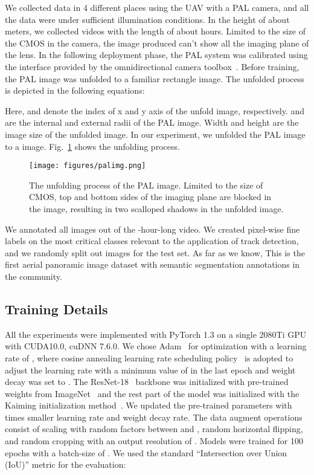 \documentclass[letterpaper, 10 pt, conference]{ieeeconf}
\begin{document}
We collected data in 4 different places using the UAV with a PAL camera, and all the data were under sufficient illumination conditions. In the height of about  meters, we collected videos with the length of about  hours. Limited to the size of the CMOS in the camera, the image produced can't show all the imaging plane of the lens.
In the following deployment phase, the PAL system was calibrated using the interface provided by the omnidirectional camera toolbox~\cite{calitoolbox}. Before training, the PAL image was unfolded to a familiar rectangle image. The unfolded process is depicted in the following equations:





Here,  and  denote the index of x and y axis of the unfold image, respectively.  and  are the internal and external radii of the PAL image. Width and height are the image size of the unfolded image.
In our experiment, we unfolded the PAL image to a  image. Fig.~\ref{fig:PAL_unfolding} shows the unfolding process.

\begin{figure}[!t]
    \centerline{\texttt{[image: figures/palimg.png]}}
    \caption{The unfolding process of the PAL image. Limited to the size of CMOS, top and bottom sides of the imaging plane are blocked in the image, resulting in two scalloped shadows in the unfolded image.}
    \label{fig:PAL_unfolding}
\end{figure}

We annotated all  images out of the -hour-long video.
We created pixel-wise fine labels on the most critical classes relevant to the application of track detection, and we randomly split out  images for the test set. As far as we know, This is the first aerial panoramic image dataset with semantic segmentation annotations in the community.

\subsection{Training Details}

All the experiments were implemented with PyTorch 1.3 on a single 2080Ti GPU with CUDA10.0, cuDNN 7.6.0.
We chose Adam~\cite{kingma2014adam} for optimization with a learning rate of , where cosine annealing learning rate scheduling policy~\cite{loshchilov2016sgdr} is adopted to adjust the learning rate with a minimum value of  in the last epoch and weight decay was set to .
The ResNet-18~\cite{resnet} backbone was initialized with pre-trained weights from ImageNet~\cite{russakovsky2015imagenet} and the rest part of the model was initialized with the Kaiming initialization method~\cite{kaiminginitialization}.
We updated the pre-trained parameters with  times smaller learning rate and weight decay rate.
The data augment operations consist of scaling with random factors between  and , random horizontal flipping, and random cropping with an output resolution of  .
Models were trained for 100 epochs with a batch-size of . We used the standard ``Intersection over Union (IoU)'' metric for the evaluation:
\end{document}
